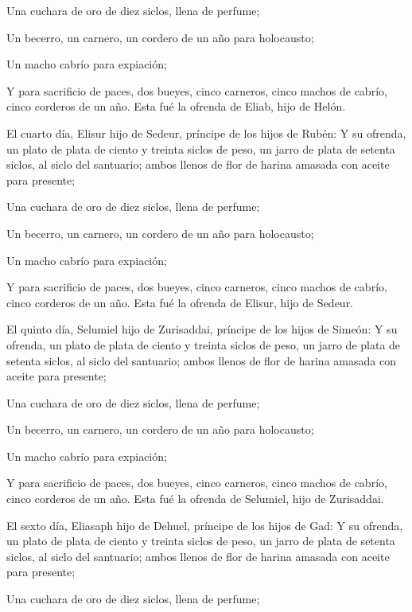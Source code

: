  Una cuchara de oro de diez siclos, llena de perfume;

 Un becerro, un carnero, un cordero de un año para
holocausto;

 Un macho cabrío para expiación;

 Y para sacrificio de paces, dos bueyes, cinco carneros,
cinco machos de cabrío, cinco corderos de un año. Esta fué la ofrenda de
Eliab, hijo de Helón.

 El cuarto día, Elisur hijo de Sedeur, príncipe de los
hijos de Rubén:  Y su ofrenda, un plato de plata de ciento
y treinta siclos de peso, un jarro de plata de setenta siclos, al siclo
del santuario; ambos llenos de flor de harina amasada con aceite para
presente;

 Una cuchara de oro de diez siclos, llena de perfume;

 Un becerro, un carnero, un cordero de un año para
holocausto;

 Un macho cabrío para expiación;

 Y para sacrificio de paces, dos bueyes, cinco carneros,
cinco machos de cabrío, cinco corderos de un año. Esta fué la ofrenda de
Elisur, hijo de Sedeur.

 El quinto día, Selumiel hijo de Zurisaddai, príncipe de
los hijos de Simeón:  Y su ofrenda, un plato de plata de
ciento y treinta siclos de peso, un jarro de plata de setenta siclos, al
siclo del santuario; ambos llenos de flor de harina amasada con aceite
para presente;

 Una cuchara de oro de diez siclos, llena de perfume;

 Un becerro, un carnero, un cordero de un año para
holocausto;

 Un macho cabrío para expiación;

 Y para sacrificio de paces, dos bueyes, cinco carneros,
cinco machos de cabrío, cinco corderos de un año. Esta fué la ofrenda de
Selumiel, hijo de Zurisaddai.

 El sexto día, Eliasaph hijo de Dehuel, príncipe de los
hijos de Gad:  Y su ofrenda, un plato de plata de ciento y
treinta siclos de peso, un jarro de plata de setenta siclos, al siclo
del santuario; ambos llenos de flor de harina amasada con aceite para
presente;

 Una cuchara de oro de diez siclos, llena de perfume;


